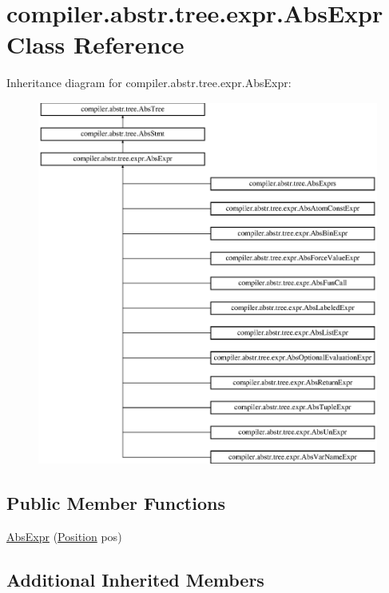 \hypertarget{classcompiler_1_1abstr_1_1tree_1_1expr_1_1_abs_expr}{}\section{compiler.\+abstr.\+tree.\+expr.\+Abs\+Expr Class Reference}
\label{classcompiler_1_1abstr_1_1tree_1_1expr_1_1_abs_expr}
Inheritance diagram for compiler.\+abstr.\+tree.\+expr.\+Abs\+Expr\+:\begin{figure}[H]
\begin{center}
\leavevmode
\includegraphics[height=12.000000cm]{classcompiler_1_1abstr_1_1tree_1_1expr_1_1_abs_expr}
\end{center}
\end{figure}
\subsection*{Public Member Functions}
\begin{DoxyCompactItemize}
\item 
\hyperlink{classcompiler_1_1abstr_1_1tree_1_1expr_1_1_abs_expr_a0d19ab25d8eda6d3e3f920f65c38b91f}{Abs\+Expr} (\hyperlink{classcompiler_1_1_position}{Position} pos)
\end{DoxyCompactItemize}
\subsection*{Additional Inherited Members}


